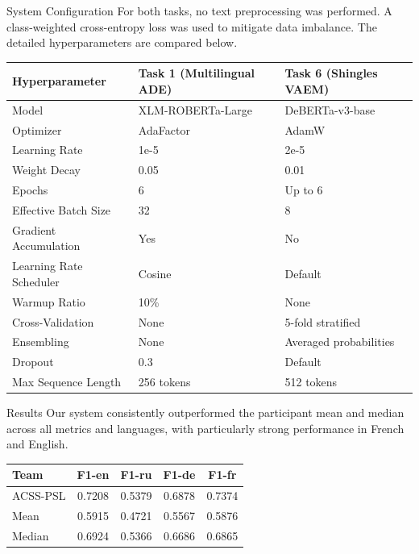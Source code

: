 \documentclass[final]{beamer}
\newlength{\colwidth}
\begin{document}
\begin{frame}[t]
\begin{columns}[t]
\begin{column}{\colwidth}
  \begin{exampleblock}{System Configuration}
    For both tasks, no text preprocessing was performed. A class-weighted cross-entropy loss was used to mitigate data imbalance. The detailed hyperparameters are compared below.
    {\small
    \begin{center}
    \begin{tabularx}{\linewidth}{l X X}
    \toprule
    \textbf{Hyperparameter} & \textbf{Task 1 (Multilingual ADE)} & \textbf{Task 6 (Shingles VAEM)} \\
    \midrule
    Model & XLM-ROBERTa-Large & DeBERTa-v3-base \\
    Optimizer & AdaFactor & AdamW \\
    Learning Rate & 1e-5 & 2e-5 \\
    Weight Decay & 0.05 & 0.01 \\
    Epochs & 6 & Up to 6 \\
    Effective Batch Size & 32 & 8 \\
    Gradient Accumulation & Yes & No \\
    Learning Rate Scheduler & Cosine & Default \\
    Warmup Ratio & 10\% & None \\
    Cross-Validation & None & 5-fold stratified \\
    Ensembling & None & Averaged probabilities \\
    Dropout & 0.3 & Default \\
    Max Sequence Length & 256 tokens & 512 tokens \\
    \bottomrule
    \end{tabularx}
    \end{center}
    }
  \end{exampleblock}
  
  \vfill %

  \begin{block}{Results}
    Our system consistently outperformed the participant mean and median across all metrics and languages, with particularly strong performance in French and English.
    \begin{center}
    \begin{tabular}{lcccc}
    \toprule
    \textbf{Team} & \textbf{F1-en} & \textbf{F1-ru} & \textbf{F1-de} & \textbf{F1-fr} \\
    \midrule
    ACSS-PSL & 0.7208 & 0.5379 & 0.6878 & 0.7374 \\
    Mean     & 0.5915 & 0.4721 & 0.5567 & 0.5876 \\
    Median   & 0.6924 & 0.5366 & 0.6686 & 0.6865 \\
    \bottomrule
    \end{tabular}


\end{center}
\end{block}
\end{column}
\end{columns}
\end{frame}
\end{document}
